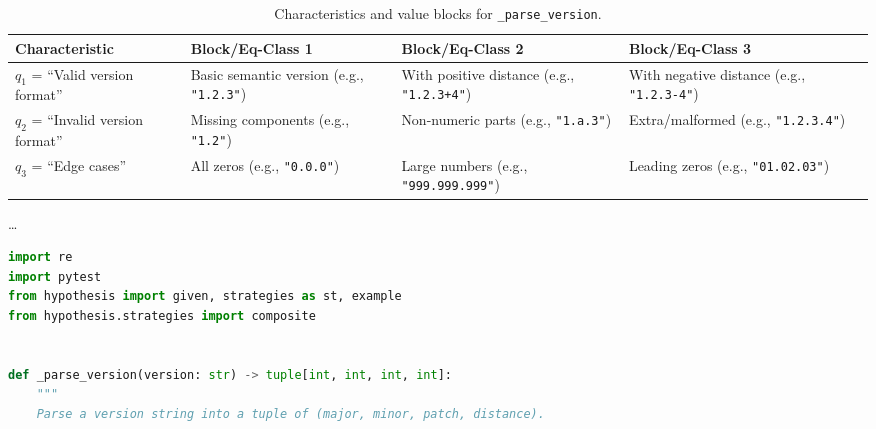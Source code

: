 \documentclass[a4paper]{scrreprt}
\begin{document}
\begin{aiTask}
\begin{answer}
    \begin{table}[h]
\centering
\begin{tabular}{|p{2.5cm}|p{2.5cm}|p{2.5cm}|p{2.5cm}|p{2.5cm}|}
\hline
\textbf{Characteristic} & \textbf{Block/Eq-Class 1} & \textbf{Block/Eq-Class 2} & \textbf{Block/Eq-Class 3} \\
\hline
$q_1$ = ``Valid version format'' 
  & Basic semantic version \newline (e.g., \texttt{"1.2.3"}) 
  & With positive distance \newline (e.g., \texttt{"1.2.3+4"}) 
  & With negative distance \newline (e.g., \texttt{"1.2.3-4"}) \\
\hline
$q_2$ = ``Invalid version format'' 
  & Missing components \newline (e.g., \texttt{"1.2"}) 
  & Non-numeric parts \newline (e.g., \texttt{"1.a.3"}) 
  & Extra/malformed \newline (e.g., \texttt{"1.2.3.4"}) \\
\hline
$q_3$ = ``Edge cases'' 
  & All zeros \newline (e.g., \texttt{"0.0.0"}) 
  & Large numbers \newline (e.g., \texttt{"999.999.999"}) 
  & Leading zeros \newline (e.g., \texttt{"01.02.03"}) \\
\hline
\end{tabular}
\caption{Characteristics and value blocks for \texttt{\_parse\_version}.}
\end{table}

    \noindent \dots


\begin{lstlisting}[language=Python]
import re
import pytest
from hypothesis import given, strategies as st, example
from hypothesis.strategies import composite


def _parse_version(version: str) -> tuple[int, int, int, int]:
    """
    Parse a version string into a tuple of (major, minor, patch, distance).
    

\end{lstlisting}
\end{answer}
\end{aiTask}
\end{document}
